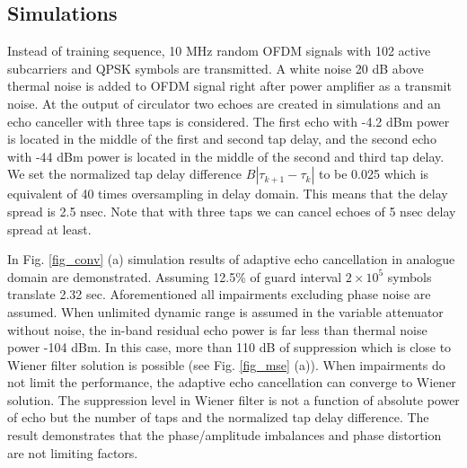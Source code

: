 \documentclass[twocolumn]{IEEEtran}
\begin{document}
\subsection{Simulations}

Instead of training sequence, 10 MHz random OFDM signals with 102
active subcarriers and QPSK symbols are transmitted. A white noise
20 dB above thermal noise is added to OFDM signal right after power
amplifier as a transmit noise. At the output of circulator two
echoes are created in simulations and an echo canceller with three
taps is considered. The first echo with -4.2 dBm power is located in
the middle of the first and second tap delay, and the second echo
with -44 dBm power is located in the middle of the second and third
tap delay. We set the normalized tap delay difference $B
|\tau_{k+1}-\tau_k|$ to be 0.025 which is equivalent of 40 times
oversampling in delay domain. This means that the delay spread is
2.5 nsec. Note that with three taps we can cancel echoes of 5 nsec
delay spread at least.


\begin{figure*}[!ht]

\centerline{ 
    \hfil
{}}


\caption{Adaptive analogue echo canceller with 3 taps,
$B|\tau_{k+1}-\tau_k |=0.025$ and two echoes (-4.2 and -44 dBm): (a)
Convergence (b) Spectrum.} \label{fig_conv}

\end{figure*}

In Fig. \ref{fig_conv} (a) simulation results of adaptive echo
cancellation in analogue domain are demonstrated. Assuming 12.5\% of
guard interval $2\times 10^5$ symbols translate 2.32 sec.
Aforementioned all impairments excluding phase noise are assumed.
When unlimited dynamic range is assumed in the variable attenuator
without noise, the in-band residual echo power is far less than
thermal noise power -104 dBm. In this case, more than 110 dB of
suppression which is close to Wiener filter solution is possible
(see Fig. \ref{fig_mse} (a)). When impairments do not limit the
performance, the adaptive echo cancellation can converge to Wiener
solution. The suppression level in Wiener filter is not a function
of absolute power of echo but the number of taps and the normalized
tap delay difference. The result demonstrates that the
phase/amplitude imbalances and phase distortion are not limiting
factors.
\end{document}
